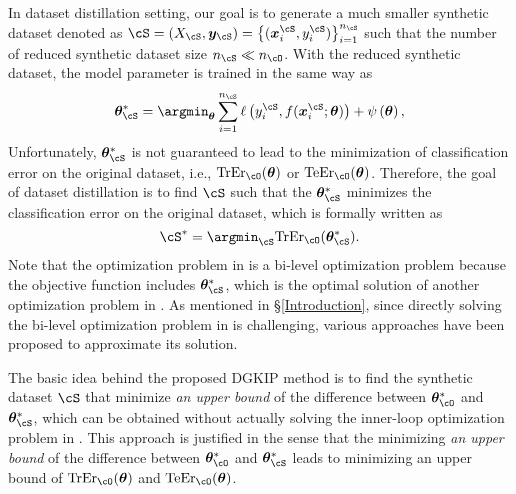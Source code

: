 In dataset distillation setting, our goal is to generate a much smaller synthetic dataset denoted as $\cS=\left(X_{\cS}, \bm y_{\cS}\right)=\left\{(\bm x^{\cS}_i, y^{\cS}_i)\right\}_{i=1}^{n_{\cS}}$ such that the number of reduced synthetic dataset size $n_{\cS} \ll n_{\cO}$.
%
With the reduced synthetic dataset, the model parameter is trained in the same way as
\begin{equation}
 \label{eq:theta_s-opt}
 \bm \theta_{\cS}^*
 =
 \argmin_{\bm \theta}
 \sum_{i=1}^{n_{\cS}}
 \ell
 \left(
 y^{\cS}_i, f(\bm x^{\cS}_i; \bm \theta)
 \right)
 +
 \psi\left(\bm \theta\right),
\end{equation}
%
Unfortunately, $\bm \theta_\cS^*$ is not guaranteed to lead to the minimization of classification error on the original dataset, i.e., ${\rm TrEr}_\cO(\bm \theta)$ or ${\rm TeEr}_\cO(\bm \theta)$.
%
Therefore, the goal of dataset distillation is to find $\cS$ such that the $\bm \theta^*_\cS$ minimizes the classification error on the original dataset, which is formally written as 
\begin{equation}
 \label{eq:bi-level-opt}
 \cS^* = \argmin_{\cS} {\rm TrEr}_\cO(\bm \theta^*_\cS).
\end{equation}
%
Note that the optimization problem in  is a bi-level optimization problem because the objective function includes \(\bm{\theta}_\cS^*\), which is the optimal solution of another optimization problem in .
%
%
As mentioned in \S\ref{Introduction}, since directly solving the bi-level optimization problem in  is challenging, various approaches have been proposed to approximate its solution.

The basic idea behind the proposed DGKIP method is to find the synthetic dataset $\cS$ that minimize \emph{an upper bound} of the difference between $\bm \theta_\cO^*$ and $\bm \theta_\cS^*$, which can be obtained without actually solving the inner-loop optimization problem in .
%
This approach is justified in the sense that the minimizing \emph{an upper bound} of the difference between $\bm \theta_\cO^*$ and $\bm \theta_\cS^*$ leads to minimizing an upper bound of ${\rm TrEr}_\cO(\bm \theta)$ and ${\rm TeEr}_\cO(\bm \theta)$.


